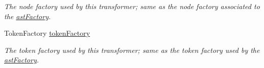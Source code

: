 \begin{DoxyCompactItemize}
\begin{DoxyCompactList}\small\item\em The node factory used by this transformer; same as the node factory associated to the \hyperlink{classedu_1_1udel_1_1cis_1_1vsl_1_1civl_1_1transform_1_1common_1_1BaseWorker_a44812bb476e4511fb6ca29a808427186}{ast\+Factory}. \end{DoxyCompactList}\item 
\hypertarget{classedu_1_1udel_1_1cis_1_1vsl_1_1civl_1_1transform_1_1common_1_1BaseWorker_ad1f6a3d2896f27ad6d2eb84f25fd2d54}{}Token\+Factory \hyperlink{classedu_1_1udel_1_1cis_1_1vsl_1_1civl_1_1transform_1_1common_1_1BaseWorker_ad1f6a3d2896f27ad6d2eb84f25fd2d54}{token\+Factory}\label{classedu_1_1udel_1_1cis_1_1vsl_1_1civl_1_1transform_1_1common_1_1BaseWorker_ad1f6a3d2896f27ad6d2eb84f25fd2d54}

\begin{DoxyCompactList}\small\item\em The token factory used by this transformer; same as the token factory used by the \hyperlink{classedu_1_1udel_1_1cis_1_1vsl_1_1civl_1_1transform_1_1common_1_1BaseWorker_a44812bb476e4511fb6ca29a808427186}{ast\+Factory}. \end{DoxyCompactList}\end{DoxyCompactItemize}
